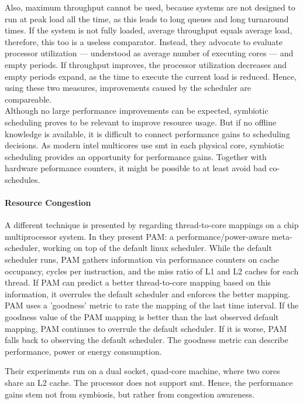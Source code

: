 Also, maximum throughput cannot be used, because systems are not
designed to run at peak load all the time, as this leads to long queues and
long turnaround times.
If the system is not fully loaded, average throughput equals average load,
therefore, this too is a useless comparator.
Instead, they advocate to evaluate processor utilization --- understood as average
number of executing cores --- and empty periods.
If throughput improves, the processor utilization decreases and empty
periods expand, as the time to execute the current load is reduced.
Hence, using these two measures, improvements caused by the scheduler are
compareable.
\\

Although no large performance improvements can be expected, symbiotic
scheduling proves to be relevant to improve resource usage.
But if no offline knowledge is available, it is difficult to connect performance
gains to scheduling decisions.
As modern \gls{intel} multicores use \gls{smt} in each physical core, symbiotic
scheduling provides an opportunity for performance gains.
Together with hardware peformance counters, it might be possible to at least
avoid bad co-schedules.
\\

\paragraph{Resource Congestion}
A different technique is presented by \citeauthor{banikazemi_pam_2008}
regarding thread-to-core mappings on a chip multiprocessor system.
In \cite{banikazemi_pam_2008} they present PAM: a performance/power-aware
meta-scheduler, working on top of the default linux scheduler.
While the default scheduler runs, PAM gathers information via performance
counters on cache occupancy, cycles per instruction, and the miss ratio of L1
and L2 caches for each thread.
If PAM can predict a better thread-to-core mapping based on this information,
it overrules the default scheduler and enforces the better mapping.
PAM uses a 'goodness' metric to rate the mapping of the last time interval.
If the goodness value of the PAM mapping is better than the last observed
default mapping, PAM continues to overrule the default scheduler.
If it is worse, PAM falls back to observing the default scheduler.
The goodness metric can describe performance, power or energy consumption.

Their experiments run on a dual socket, quad-core machine, where two cores
share an L2 cache.
The processor does not support \gls{smt}.
Hence, the performance gains stem not from symbiosis, but rather from
congestion awareness.
\\

